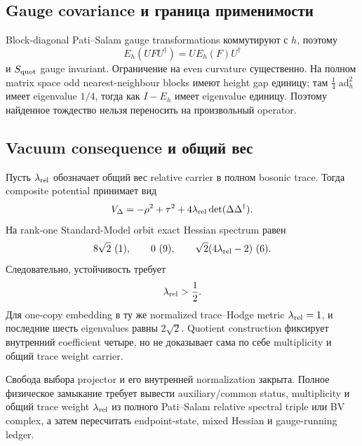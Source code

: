 \subsection{Gauge covariance и граница применимости}

Block-diagonal Pati--Salam gauge transformations коммутируют с \(h\), поэтому
\begin{equation}
 E_h(UFU^\dagger)=UE_h(F)U^\dagger
\end{equation}
и \(S_{\rm quot}\) gauge invariant. Ограничение на even curvature
существенно. На полном matrix space odd nearest-neighbour blocks имеют
height gap единицу; там \(\frac14\operatorname{ad}_h^2\) имеет eigenvalue
\(1/4\), тогда как \(I-E_h\) имеет eigenvalue единицу. Поэтому найденное
тождество нельзя переносить на произвольный operator.

\subsection{Vacuum consequence и общий вес}

Пусть \(\lambda_{\rm rel}\) обозначает общий вес relative carrier в полном
bosonic trace. Тогда composite potential принимает вид
\begin{equation}
 V_\Delta=-\rho^2+\tau^2
 +4\lambda_{\rm rel}\det(\Delta\Delta^\dagger).
\end{equation}
На rank-one Standard-Model orbit exact Hessian spectrum равен
\begin{equation}
 8\sqrt2\ (1),
 \qquad
 0\ (9),
 \qquad
 \sqrt2(4\lambda_{\rm rel}-2)\ (6).
 \label{eq:ps-relative-parent-hessian}
\end{equation}
Следовательно, устойчивость требует
\begin{equation}
 \lambda_{\rm rel}>\frac12.
\end{equation}
Для one-copy embedding в ту же normalized trace--Hodge metric
\(\lambda_{\rm rel}=1\), и последние шесть eigenvalues равны
\(2\sqrt2\). Quotient construction фиксирует внутренний coefficient четыре,
но не доказывает сама по себе multiplicity и общий trace weight carrier.

\begin{theorem}
Свобода выбора projector и его внутренней normalization закрыта. Полное
физическое замыкание требует вывести auxiliary/common status, multiplicity
и общий trace weight \(\lambda_{\rm rel}\) из полного Pati--Salam relative
spectral triple или BV complex, а затем пересчитать endpoint-state, mixed
Hessian и gauge-running ledger.
\end{theorem}

